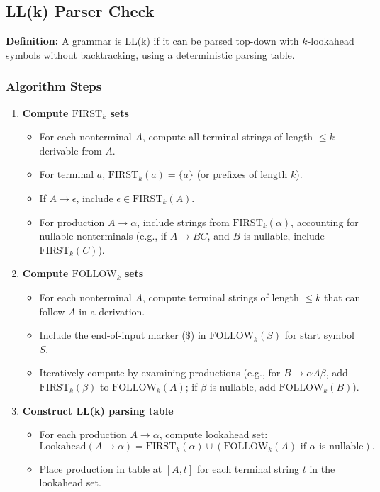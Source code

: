 \subsection{LL(k) Parser Check}

\textbf{Definition:} A grammar is LL(k) if it can be parsed top-down with \( k \)-lookahead symbols without backtracking, using a deterministic parsing table.

\subsubsection{Algorithm Steps}

\begin{enumerate}
    \item \textbf{Compute \(\text{FIRST}_k\) sets}
    \begin{itemize}
        \item For each nonterminal \( A \), compute all terminal strings of length \( \leq k \) derivable from \( A \).
        \item For terminal \( a \), \(\text{FIRST}_k(a) = \{a\}\) (or prefixes of length \( k \)).
        \item If \( A \to \epsilon \), include \( \epsilon \in \text{FIRST}_k(A) \).
        \item For production \( A \to \alpha \), include strings from \( \text{FIRST}_k(\alpha) \), accounting for nullable nonterminals (e.g., if \( A \to BC \), and \( B \) is nullable, include \( \text{FIRST}_k(C) \)).
    \end{itemize}

    \item \textbf{Compute \(\text{FOLLOW}_k\) sets}
    \begin{itemize}
        \item For each nonterminal \( A \), compute terminal strings of length \( \leq k \) that can follow \( A \) in a derivation.
        \item Include the end-of-input marker (\( \$ \)) in \(\text{FOLLOW}_k(S)\) for start symbol \( S \).
        \item Iteratively compute by examining productions (e.g., for \( B \to \alpha A \beta \), add \(\text{FIRST}_k(\beta)\) to \(\text{FOLLOW}_k(A)\); if \( \beta \) is nullable, add \(\text{FOLLOW}_k(B)\)).
    \end{itemize}

    \item \textbf{Construct LL(k) parsing table}
    \begin{itemize}
        \item For each production \( A \to \alpha \), compute lookahead set:
        \[
        \text{Lookahead}(A \to \alpha) = \text{FIRST}_k(\alpha) \cup (\text{FOLLOW}_k(A) \text{ if } \alpha \text{ is nullable}).
        \]
        \item Place production in table at \( [A, t] \) for each terminal string \( t \) in the lookahead set.
    \end{itemize}


\end{enumerate}
